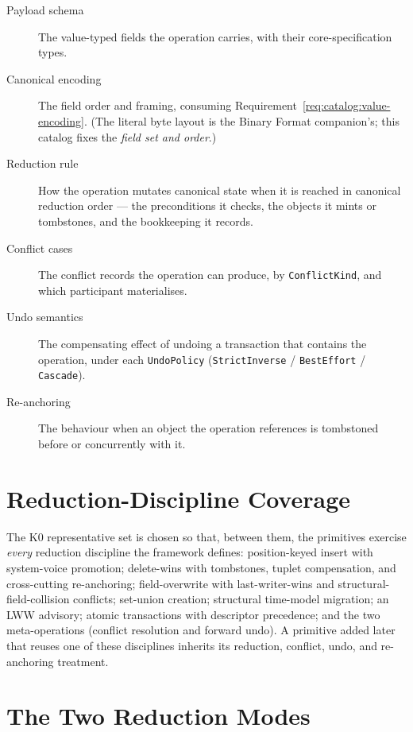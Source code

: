\documentclass[11pt,letterpaper]{report}
\begin{document}
\begin{description}
  \item[Payload schema] The value-typed fields the operation carries, with their
    core-specification types.
  \item[Canonical encoding] The field order and framing, consuming
    Requirement~\ref{req:catalog:value-encoding}. (The literal byte layout is the
    Binary Format companion's; this catalog fixes the \emph{field set and order}.)
  \item[Reduction rule] How the operation mutates canonical state when it is
    reached in canonical reduction order --- the preconditions it checks, the
    objects it mints or tombstones, and the bookkeeping it records.
  \item[Conflict cases] The conflict records the operation can produce, by
    \texttt{ConflictKind}, and which participant materialises.
  \item[Undo semantics] The compensating effect of undoing a transaction that
    contains the operation, under each \texttt{UndoPolicy}
    (\texttt{StrictInverse} / \texttt{BestEffort} / \texttt{Cascade}).
  \item[Re-anchoring] The behaviour when an object the operation references is
    tombstoned before or concurrently with it.
\end{description}

\section{Reduction-Discipline Coverage}

The K0 representative set is chosen so that, between them, the primitives
exercise \emph{every} reduction discipline the framework defines:
position-keyed insert with system-voice promotion; delete-wins with tombstones,
tuplet compensation, and cross-cutting re-anchoring; field-overwrite with
last-writer-wins and structural-field-collision conflicts; set-union creation;
structural time-model migration; an LWW advisory; atomic transactions with
descriptor precedence; and the two meta-operations (conflict resolution and
forward undo). A primitive added later that reuses one of these disciplines
inherits its reduction, conflict, undo, and re-anchoring treatment.

\section{The Two Reduction Modes}
\label{sec:framework:modes}
\end{document}

